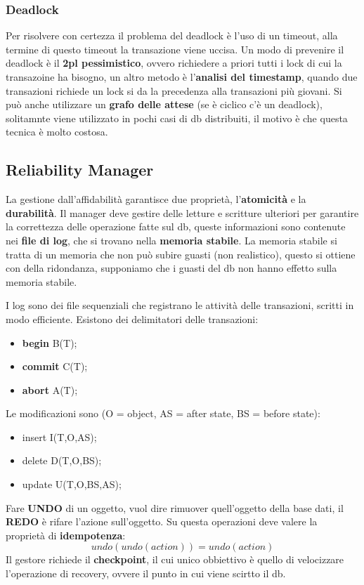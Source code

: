 \documentclass[12pt]{article}
\begin{document}
\subsubsection{Deadlock}
Per risolvere con certezza il problema del deadlock \`e l'uso di un timeout, alla termine di questo timeout la transazione viene uccisa. Un modo di prevenire il deadlock \`e il \textbf{2pl pessimistico}, ovvero richiedere a priori tutti i lock di cui la transazoine ha bisogno, un altro metodo \`e l'\textbf{analisi del timestamp}, quando due transazioni richiede un lock si da la precedenza alla transazioni pi\`u giovani. Si pu\`o anche utilizzare un \textbf{grafo delle attese} (se \`e ciclico c'\`e un deadlock), solitamnte viene utilizzato in pochi casi di db distribuiti, il motivo \`e che questa tecnica \`e molto costosa.



\subsection{Reliability Manager}
La gestione dall'affidabilit\`a garantisce due propriet\`a, l'\textbf{atomicit\`a} e la \textbf{durabilit\`a}. Il manager deve gestire delle letture e scritture ulteriori per garantire la correttezza delle operazione fatte sul db, queste informazioni sono contenute nei \textbf{file di log}, che si trovano nella \textbf{memoria stabile}. La memoria stabile si tratta di un memoria che non pu\`o subire guasti (non realistico), questo si ottiene con della ridondanza, supponiamo che i guasti del db non hanno effetto sulla memoria stabile.

I log sono dei file sequenziali che registrano le attivit\`a delle transazioni, scritti in modo efficiente. Esistono dei delimitatori delle transazioni:
\begin{itemize}
    \item \textbf{begin} B(T);
    \item \textbf{commit} C(T);
    \item \textbf{abort} A(T);
\end{itemize}
Le modificazioni sono (O = object, AS = after state, BS = before state):
\begin{itemize}
    \item insert I(T,O,AS);
    \item delete D(T,O,BS);
    \item update U(T,O,BS,AS);
\end{itemize}
Fare \textbf{UNDO} di un oggetto, vuol dire rimuover quell'oggetto della base dati, il \textbf{REDO} \`e rifare l'azione sull'oggetto. Su questa operazioni deve valere la propriet\`a di \textbf{idempotenza}:
\[ undo(undo(action)) = undo(action) \]
Il gestore richiede il \textbf{checkpoint}, il cui unico obbiettivo \`e quello di velocizzare l'operazione di recovery, ovvere il punto in cui viene scirtto il db.
\end{document}
